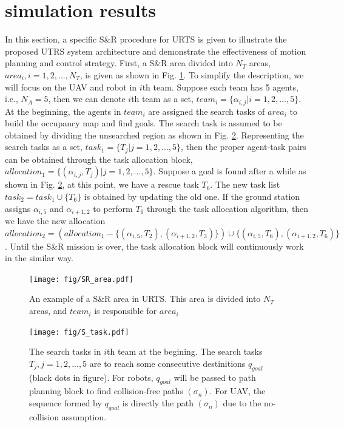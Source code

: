 \documentclass{ieeeaccess}
\begin{document}
\section{simulation results}
In this section, a specific S\&R procedure for URTS is given to illustrate the proposed UTRS system architecture and demonstrate the effectiveness of motion planning and control strategy. First, a S\&R area divided into $N_T$ areas, $area_i,i=1,2,...,N_T$, is given as shown in Fig. \ref{fig:SR_area}. To simplify the description, we will focus on the UAV and robot in $i$th team. Suppose each team has 5 agents, i.e., $N_A=5$, then we can denote $i$th team as a set, $team_i=\{ \alpha_{i,j} | i=1,2,...,5 \}$. At the beginning, the agents in $team_i$ are assigned the search tasks of $area_i$ to build the occupancy map and find goals. The search task is assumed to be obtained by dividing the unsearched region as shown in Fig. \ref{fig:S_task}. Representing the search tasks as a set, $task_1=\{ T_j | j=1,2,...,5 \}$, then the proper agent-task pairs can be obtained through the task allocation block, $allocation_1=\{ (\alpha_{i,j},T_j) | j=1,2,...,5 \}$. Suppose a goal is found after a while as shown in Fig. \ref{fig:S_task}, at this point, we have a rescue task $T_6$. The new task list $task_2=task_1\cup\{ T_6 \}$ is obtained by updating the old one. If the ground station assigns $\alpha_{i,5}$ and $\alpha_{i+1,2}$ to perform $T_6$ through the task allocation algorithm, then we have the new allocation $allocation_2=(allocation_1-\{ (\alpha_{i,5},T_2),(\alpha_{i+1,2},T_3) \})\cup\{ (\alpha_{i,5},T_6),(\alpha_{i+1,2},T_6) \}$. Until the S\&R mission is over, the task allocation block will continuously work in the similar way.
\begin{figure}[htbp]
    \centering
    \texttt{[image: fig/SR\_area.pdf]}\caption{An example of a S\&R area in URTS. This area is divided into $N_T$ areas, and $team_i$ is responsible for $area_i$}%
    \label{fig:SR_area}
\end{figure}
\begin{figure}[htbp]
    \centering
    \texttt{[image: fig/S\_task.pdf]}\caption{The search tasks in $i$th team at the begining. The search tasks $T_j,j=1,2,...,5$ are to reach some consecutive destinitions $q_{goal}$ (black dots in figure). For robots, $q_{goal}$ will be passed to path planning block to find collision-free paths $(\sigma_n)$. For UAV, the sequence formed by $q_{goal}$ is directly the path $(\sigma_n)$ due to the no-collision assumption.}
    \label{fig:S_task}
\end{figure}
\end{document}
